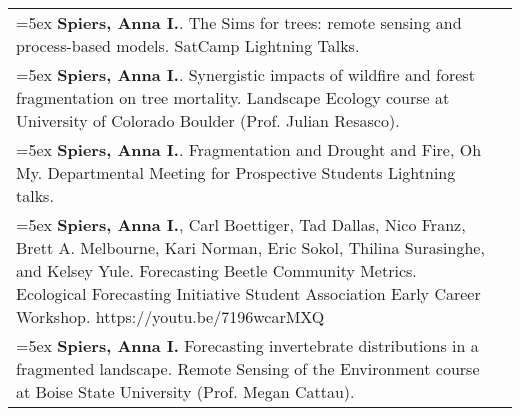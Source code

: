 \begin{longtable}{@{}>{\raggedright}p{5.25in} @{} >{\raggedleft}X@{}}

\hangindent=5ex \textbf{Spiers, Anna I.}. The Sims for trees: remote sensing and process-based models. SatCamp Lightning Talks. & 2024 \tabularnewline %

\hangindent=5ex \textbf{Spiers, Anna I.}. Synergistic impacts of wildfire and forest fragmentation on tree mortality. Landscape Ecology course at University of Colorado Boulder (Prof. Julian Resasco). & 2023 \tabularnewline %

\hangindent=5ex \textbf{Spiers, Anna I.}. Fragmentation and Drought and Fire, Oh My. Departmental Meeting for Prospective Students Lightning talks. & 2022 \tabularnewline %

\hangindent=5ex \textbf{Spiers, Anna I.}, Carl Boettiger, Tad Dallas, Nico Franz, Brett A. Melbourne, Kari Norman, Eric Sokol, Thilina Surasinghe, and Kelsey Yule. Forecasting Beetle Community Metrics. Ecological Forecasting Initiative Student Association Early Career Workshop. https://youtu.be/7196wcarMXQ & 2021 \tabularnewline %

\hangindent=5ex \textbf{Spiers, Anna I.} Forecasting invertebrate distributions in a fragmented landscape. Remote Sensing of the Environment course at Boise State University (Prof. Megan Cattau). & 2020  \tabularnewline %

\end{longtable}
